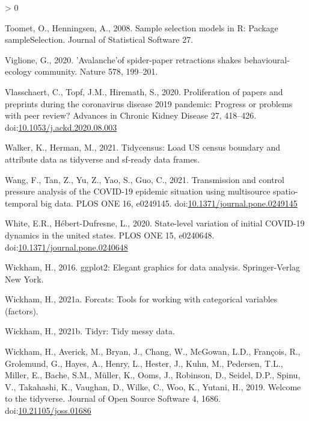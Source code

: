 \documentclass[]{elsarticle} %
\newlength{\cslhangindent}
\newenvironment{CSLReferences}[2] %
 {%
  \setlength{\parindent}{0pt}
  \ifodd #1 \everypar{\setlength{\hangindent}{\cslhangindent}}\ignorespaces\fi
  \ifnum #2 > 0
  \setlength{\parskip}{#2\baselineskip}
  \fi
 }%
 {}
\begin{document}
\begin{CSLReferences}{1}{0}
\leavevmode\hypertarget{ref-sampleSelection2008}{}%
Toomet, O., Henningsen, A., 2008. Sample selection models in {R}:
Package {sampleSelection}. Journal of Statistical Software 27.

\leavevmode\hypertarget{ref-Viglione2020avalanche}{}%
Viglione, G., 2020. 'Avalanche'of spider-paper retractions shakes
behavioural-ecology community. Nature 578, 199--201.

\leavevmode\hypertarget{ref-Vlasschaert2020proliferation}{}%
Vlasschaert, C., Topf, J.M., Hiremath, S., 2020. Proliferation of papers
and preprints during the coronavirus disease 2019 pandemic: Progress or
problems with peer review? Advances in Chronic Kidney Disease 27,
418--426.
doi:\href{https://doi.org/10.1053/j.ackd.2020.08.003}{10.1053/j.ackd.2020.08.003}

\leavevmode\hypertarget{ref-R-tidycensus}{}%
Walker, K., Herman, M., 2021. Tidycensus: Load US census boundary and
attribute data as tidyverse and sf-ready data frames.

\leavevmode\hypertarget{ref-Wang2021transmission}{}%
Wang, F., Tan, Z., Yu, Z., Yao, S., Guo, C., 2021. Transmission and
control pressure analysis of the COVID-19 epidemic situation using
multisource spatio-temporal big data. PLOS ONE 16, e0249145.
doi:\href{https://doi.org/10.1371/journal.pone.0249145}{10.1371/journal.pone.0249145}

\leavevmode\hypertarget{ref-White2020state}{}%
White, E.R., Hébert-Dufresne, L., 2020. State-level variation of initial
COVID-19 dynamics in the united states. PLOS ONE 15, e0240648.
doi:\href{https://doi.org/10.1371/journal.pone.0240648}{10.1371/journal.pone.0240648}

\leavevmode\hypertarget{ref-ggplot22016}{}%
Wickham, H., 2016. ggplot2: Elegant graphics for data analysis.
Springer-Verlag New York.

\leavevmode\hypertarget{ref-R-forcats}{}%
Wickham, H., 2021a. Forcats: Tools for working with categorical
variables (factors).

\leavevmode\hypertarget{ref-R-tidyr}{}%
Wickham, H., 2021b. Tidyr: Tidy messy data.

\leavevmode\hypertarget{ref-tidyverse2019}{}%
Wickham, H., Averick, M., Bryan, J., Chang, W., McGowan, L.D., François,
R., Grolemund, G., Hayes, A., Henry, L., Hester, J., Kuhn, M., Pedersen,
T.L., Miller, E., Bache, S.M., Müller, K., Ooms, J., Robinson, D.,
Seidel, D.P., Spinu, V., Takahashi, K., Vaughan, D., Wilke, C., Woo, K.,
Yutani, H., 2019. Welcome to the {tidyverse}. Journal of Open Source
Software 4, 1686.
doi:\href{https://doi.org/10.21105/joss.01686}{10.21105/joss.01686}


\end{CSLReferences}
\end{document}
